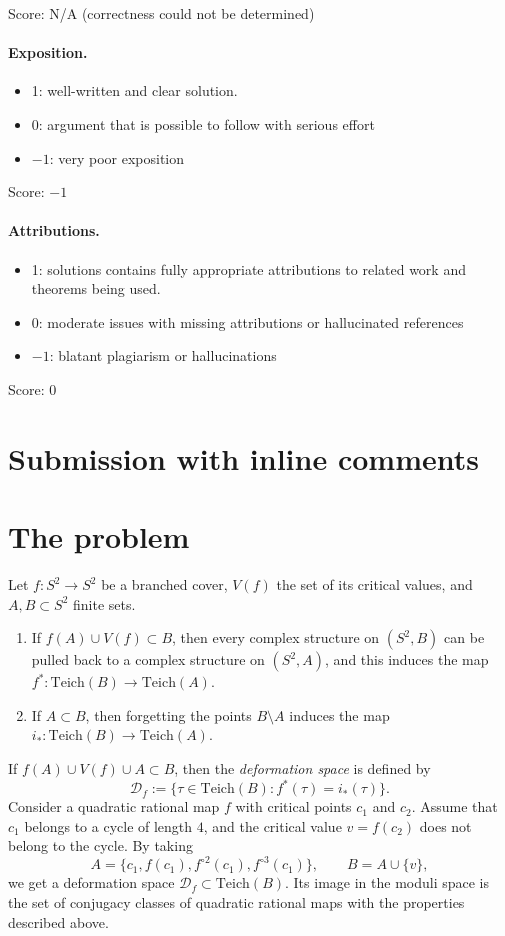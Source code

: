 \documentclass[11pt]{article}
\theoremstyle{definition}
\newcommand{\Teich}{\mathrm{Teich}}
\newcommand{\D}{\mathcal D}
\begin{document}
\noindent Score: N/A (correctness could not be determined)

\paragraph{Exposition.}
\begin{itemize}
	\item  1: well-written and clear solution.
	\item  0: argument that is possible to follow with serious effort
	\item  $-1$: very poor exposition
\end{itemize}

\noindent Score: $-1$

\paragraph{Attributions.}
\begin{itemize}
	\item  1: solutions contains fully appropriate attributions
		to related work and theorems being used.
	\item  0: moderate issues with missing attributions or hallucinated references
	\item  $-1$: blatant plagiarism or hallucinations
\end{itemize}

\noindent Score: 0

\newpage
\section{Submission with inline comments}


\section{The problem}

Let $f\colon S^2\to S^2$ be a branched cover, $V(f)$ the set of its critical values, and $A,B\subset S^2$ finite sets.
\begin{enumerate}
\item If $f(A)\cup V(f)\subset B$, then every complex structure on $(S^2,B)$ can be pulled back to a complex structure on $(S^2,A)$, and this induces the map $f^*\colon\Teich(B)\to\Teich(A)$.
\item If $A\subset B$, then forgetting the points $B\setminus A$ induces the map $i_*\colon\Teich(B)\to\Teich(A)$.
\end{enumerate}
If $f(A)\cup V(f)\cup A\subset B$, then the \emph{deformation space} is defined by
\[\D_f:=\{\tau\in\Teich(B): f^*(\tau)=i_*(\tau)\}.\]
Consider a quadratic rational map $f$ with critical points $c_1$ and $c_2$. Assume that $c_1$ belongs to a cycle of length $4$, and the critical value $v=f(c_2)$ does not belong to the cycle. By taking
\[A=\{c_1,f(c_1),f^{\circ2}(c_1),f^{\circ3}(c_1)\},\qquad B=A\cup\{v\},\]
we get a deformation space $\D_f\subset\Teich(B)$. Its image in the moduli space is the set of conjugacy classes of quadratic rational maps with the properties described above.
\end{document}
